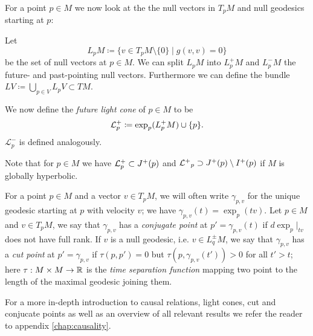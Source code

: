 For a point $p\in M$ we now look at the the null vectors in $T_pM$ and null geodesics starting at $p$:
\begin{definition}\label{def:lightcone}
    Let 
    \[
    L_pM \coloneqq \{ v\in T_pM\setminus\{0\} \mid g(v,v)=0 \}
    \]
    be the set of null vectors at $p\in M$. We can split $L_pM$ into $L^+_pM$ and $L^-_pM$ the future- and past-pointing null vectors. Furthermore we can define the bundle $LV\coloneqq\bigcup_{p\in V}L_pV\subset TM$.
    
    We now define the \emph{future light cone} of $p\in M$ to be 
    \[
    \mathcal{L}^+_p \coloneqq \exp_p(L^+_pM) \cup \{p\}.
    \]
    $\mathcal{L}^-_p$ is defined analogously.


    Note that for $p\in M$ we have ${\mathcal{L}}^+_p\subset J^+(p)$ and ${\mathcal{L^+}}_p\supset J^+(p)\setminus I^+(p)$ if $M$ is globally hyperbolic.
\end{definition}

For a point $p\in M$ and a vector $v\in T_pM$, we will often write $\gamma_{p,v}$ for the unique geodesic starting at $p$ with velocity $v$; we have $\gamma_{p,v}(t)=\exp_p(tv)$.
Let $p\in M$ and $v\in T_pM$, we say that $\gamma_{p,v}$ has a \emph{conjugate point} at $p'=\gamma_{p,v}(t)$ if $d\exp_p\rvert_{tv}$ does not have full rank. If $v$ is a null geodesic, i.e. $v\in L^\pm_qM$, we say that $\gamma_{p,v}$ has a \emph{cut point} at $p'=\gamma_{p,v}$ if $\tau(p,p')=0$ but $\tau(p,\gamma_{p,v}(t'))>0$ for all $t'>t$; here $\tau:M\times M\to \mathbb{R}$ is the \emph{time separation function} mapping two point to the length of the maximal geodesic joining them.

For a more in-depth introduction to causal relations, light cones, cut and conjucate points as well as an overview of all relevant results we refer the reader to appendix \ref{chap:causality}.

